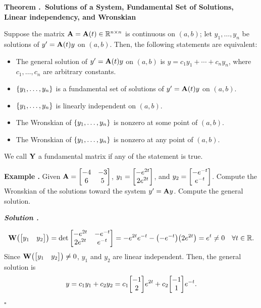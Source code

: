 \documentclass[12pt, a4paper]{article}
\newcounter{index}[subsection]
\newenvironment*{eg}{\begin{framed}\par\noindent\textbf{Example \thesubsection.\stepcounter{index}\theindex}}{\par\end{framed}}
\newenvironment*{thm}[1]{\begin{tcolorbox}\par\noindent\textbf{Theorem \thesubsection.\stepcounter{index}\theindex\ #1} \par}{\par\end{tcolorbox}}
\newcounter{nprf}[subsection]
\newenvironment*{sol}{\par\indent\textbf{\textit{Solution \stepcounter{nprf}\thenprf.}}\par}{\hfill{$\square$}\par}
\def\R{{\mathbb{R}}}
\def\A{\vb A}
\def\Y{\vb Y}
\def\W{\vb W}
\begin{document}
\begin{thm}{Solutions of a System, Fundamental Set of Solutions, Linear independency, and Wronskian}
	Suppose the matrix $\A=\A(t)\in\R^{n\times n}$ is continuous on $(a,b)$; let $y_1,\dots,y_n$ be solutions of $y'=\A(t)y$ on $(a,b)$. Then, the following statements are equivalent: 
	\begin{itemize}
		\item The general solution of $y'=\A(t)y$ on $(a,b)$ is $y=c_1y_1+\cdots+c_ny_n$, where $c_1,\dots,c_n$ are arbitrary constants.
		\item $\qty{y_1,\dots,y_n}$ is a fundamental set of solutions of $y'=\A(t)y$ on $(a,b)$.
		\item $\qty{y_1,\dots,y_n}$ is linearly independent on $(a,b)$.
		\item The Wronskian of $\qty{y_1,\dots,y_n}$ is nonzero at some point of $(a,b)$.
		\item The Wronskian of $\qty{y_1,\dots,y_n}$ is nonzero at any point of $(a,b)$.
	\end{itemize}
	We call $\Y$ a fundamental matrix if any of the statement is true. 
\end{thm}
\begin{eg}
	Given $\A=\mqty[-4&-3\\6&5]$, $y_1=\mqty[-e^{2t}\\2e^{2t}]$, and $y_2=\mqty[-e^{-t}\\e^{-t}]$. Compute the Wronskian of the solutions toward the system $y'=\A y$. Compute the general solution.
	\begin{sol}
		\[\W\qty(\mqty[y_1&y_2])=\det\mqty[-e^{2t}&-e^{-t}\\2e^{2t}&e^{-t}]=-e^{2t}e^{-t}-\qty(-e^{-t})\qty(2e^{2t})=e^t\neq0\quad\forall t\in\R.\] Since $\W\qty(\mqty[y_1&y_2])\neq0$, $y_1$ and $y_2$ are linear independent. Then, the general solution is \[y=c_1y_1+c_2y_2=c_1\mqty[-1\\2]e^{2t}+c_2\mqty[-1\\1]e^{-t}.\] 
	\end{sol}
\end{eg}
\end{document}
